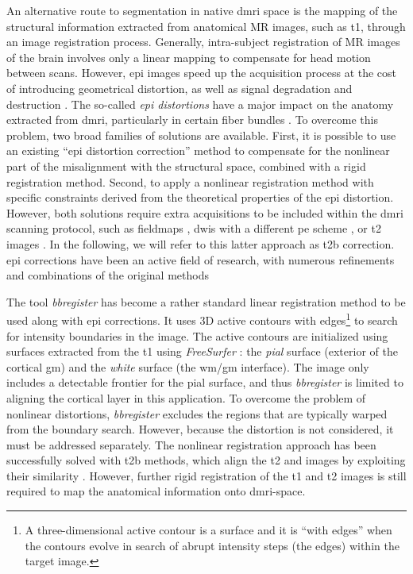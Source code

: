 An alternative route to segmentation in native \gls*{dmri} space is the mapping of the
  structural information extracted from anatomical MR images, such as \gls*{t1}, through
  an image registration process.
Generally, intra-subject registration of MR images of the brain involves only a linear
  mapping to compensate for head motion between scans.
However, \gls*{epi} images speed up the acquisition process at the cost of introducing geometrical
  distortion, as well as signal degradation and destruction \citep{jezzard_correction_1995}.
The so-called \emph{\gls*{epi} distortions} have a major impact on the anatomy extracted
  from \gls*{dmri}, particularly in certain fiber bundles \citep{irfanoglu_effects_2012}.
To overcome this problem, two broad families of solutions are available.
First, it is possible to use an existing ``\gls*{epi} distortion correction''
  method to compensate for the nonlinear part of the misalignment with the structural space,
  combined with a rigid registration method.
Second, to apply a nonlinear registration method with specific constraints derived from the
  theoretical properties of the \gls*{epi} distortion.
However, both solutions require extra acquisitions to be included within the \gls*{dmri} scanning
  protocol, such as fieldmaps \citep{jezzard_correction_1995}, \glspl*{dwi} with a different
  \gls*{pe} scheme \citep{cordes_geometric_2000,chiou_simple_2000}, or \gls*{t2} images
  \citep{kybic_unwarping_2000}.
In the following, we will refer to this latter approach as \gls*{t2b} correction.
\Gls*{epi} corrections have been an active field of research, with numerous refinements and
  combinations of the original methods \citep{holland_efficient_2010,andersson_comprehensive_2012,
  irfanoglu_drbuddi_2015}

The tool \emph{bbregister} \citep{greve_accurate_2009} has become a rather standard linear
  registration method to be used along with \gls*{epi} corrections.
It uses 3D active contours with edges\footnote{A three-dimensional active contour is a surface
  and it is ``with edges'' when the contours evolve in search of abrupt intensity steps (the edges) within
  the target image.} to search for intensity boundaries in the \lowb{} image.
The active contours are initialized using surfaces extracted from the \gls*{t1} using
  \emph{FreeSurfer} \citep{fischl_freesurfer_2012}: the \emph{pial} surface (exterior of the
  cortical \gls*{gm}) and the \emph{white} surface (the \gls*{wm}/\gls*{gm} interface).
The \lowb{} image only includes a detectable frontier for the pial surface, and thus
  \emph{bbregister} is limited to aligning the cortical layer in this
  application.
To overcome the problem of nonlinear distortions, \emph{bbregister} excludes the
  regions that are typically warped from the boundary search.
However, because the distortion is not considered, it must be addressed separately.
The nonlinear registration approach has been successfully solved with \gls*{t2b} methods,
  which align the \gls*{t2} and \lowb{} images by exploiting their similarity
  \citep{kybic_unwarping_2000,studholme_accurate_2000}.
However, further rigid registration of the \gls*{t1} and \gls*{t2} images is still required to
  map the anatomical information onto \gls*{dmri}-space.

